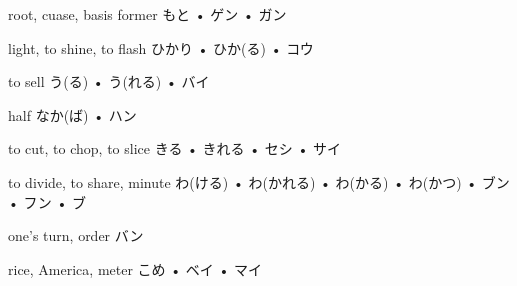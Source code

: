 



\setcounter{cardnum}{73}

		{root, cuase, basis former}
		{もと • ゲン • ガン}
		{}{}
		{}{}
		{}{}
		{}{}
		{}{}

		{light, to shine, to flash}
		{ひかり • ひか(る) • コウ}
		{}{}
		{}{}
		{}{}
		{}{}
		{}{}

		{to sell}
		{う(る) • う(れる) • バイ}
		{}{}
		{}{}
		{}{}
		{}{}
		{}{}

		{half}
		{なか(ば) • ハン}
		{}{}
		{}{}
		{}{}
		{}{}
		{}{}

		{to cut, to chop, to slice}
		{きる • きれる • セシ • サイ}
		{}{}
		{}{}
		{}{}
		{}{}
		{}{}

		{to divide, to share, minute}
		{わ(ける) • わ(かれる) • わ(かる) • わ(かつ) • ブン • フン • ブ}
		{}{}
		{}{}
		{}{}
		{}{}
		{}{}

		{one's turn, order}
		{バン}
		{}{}
		{}{}
		{}{}
		{}{}
		{}{}

		{rice, America, meter}
		{こめ • ベイ • マイ}
		{}{}
		{}{}
		{}{}
		{}{}
		{}{}

